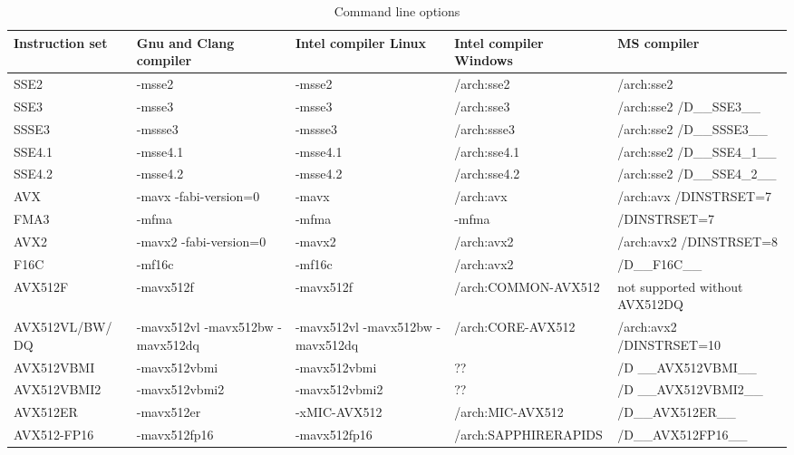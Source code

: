 \documentclass[vcl_manual.tex]{subfiles}
\begin{document}
\begin {table}[h]
\caption{Command line options}
\label{table:CommandLineOptions}
\begin{tabular}{|p{26mm}|p{28mm}|p{28mm}|p{28mm}|p{28mm}|}
\hline
\bfseries Instruction set & \bfseries Gnu and Clang compiler & \bfseries Intel compiler Linux & \bfseries Intel compiler Windows & \bfseries MS compiler \\ \hline

SSE2 & -msse2 & -msse2 & /arch:sse2 & /arch:sse2 \\ \hline
SSE3 & -msse3 & -msse3 & /arch:sse3 & /arch:sse2 \newline /D\_\_SSE3\_\_ \\ \hline
SSSE3 & -mssse3 & -mssse3 & /arch:ssse3 & /arch:sse2 \newline /D\_\_SSSE3\_\_ \\ \hline
SSE4.1 & -msse4.1 & -msse4.1 & /arch:sse4.1 & /arch:sse2 \newline /D\_\_SSE4\_1\_\_ \\ \hline
SSE4.2 & -msse4.2 & -msse4.2 & /arch:sse4.2 & /arch:sse2 \newline /D\_\_SSE4\_2\_\_ \\ \hline
AVX & -mavx \newline -fabi-version=0 & -mavx & /arch:avx & /arch:avx /DINSTRSET=7 \\ \hline
FMA3 & -mfma & -mfma & -mfma & /DINSTRSET=7 \\ \hline
AVX2 & -mavx2 \newline -fabi-version=0 & -mavx2 & /arch:avx2 & /arch:avx2 \newline /DINSTRSET=8 \\ \hline
F16C & -mf16c & -mf16c & /arch:avx2 & /D\_\_F16C\_\_ \\ \hline
AVX512F & -mavx512f & -mavx512f & /arch:COMMON-AVX512 & not supported without AVX512DQ\\ \hline
AVX512VL/BW/ DQ & -mavx512vl -mavx512bw -mavx512dq & -mavx512vl -mavx512bw -mavx512dq & /arch:CORE-AVX512 & /arch:avx2 /DINSTRSET=10 \\ \hline
AVX512VBMI & -mavx512vbmi & -mavx512vbmi & ?? & /D \_\_AVX512VBMI\_\_ \\ \hline
AVX512VBMI2 & -mavx512vbmi2 & -mavx512vbmi2 & ?? & /D \_\_AVX512VBMI2\_\_ \\ \hline
AVX512ER & -mavx512er & -xMIC-AVX512 & /arch:MIC-AVX512 & /D\_\_AVX512ER\_\_ \\ \hline
AVX512-FP16 & -mavx512fp16 & -mavx512fp16 & /arch:SAPPHIRERAPIDS & /D\_\_AVX512FP16\_\_ \\ \hline
\end{tabular}
\end{table}
\end{document}
